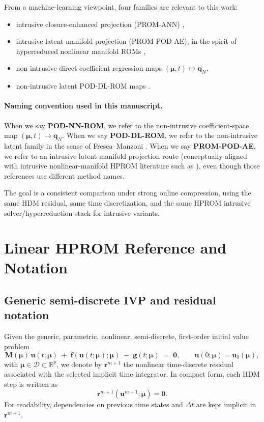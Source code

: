 \documentclass[11pt]{article}
\begin{document}
From a machine-learning viewpoint, four families are relevant to this work:
\begin{itemize}
\item intrusive closure-enhanced projection (PROM-ANN) \cite{barnett2023neural},
\item intrusive latent-manifold projection (PROM-POD-AE), in the spirit of hyperreduced nonlinear manifold ROMs \cite{romor2025explicable},
\item non-intrusive direct-coefficient regression maps $(\bm\mu,t)\mapsto\mathbf q_N$,
\item non-intrusive latent POD-DL-ROM maps \cite{fresca2022pod}.
\end{itemize}

\paragraph{Naming convention used in this manuscript.}
When we say \textbf{POD-NN-ROM}, we refer to the non-intrusive coefficient-space
map $(\bm\mu,t)\mapsto\mathbf q_N$. When we say \textbf{POD-DL-ROM}, we refer to
the non-intrusive latent family in the sense of Fresca--Manzoni
\cite{fresca2022pod}. When we say \textbf{PROM-POD-AE}, we refer
to an intrusive latent-manifold projection route (conceptually aligned with
intrusive nonlinear-manifold HPROM literature such as \cite{romor2025explicable}),
even though those references use different method names.

The goal is a consistent comparison under strong online compression, using the same HDM residual, same time discretization, and the same HPROM intrusive solver/hyperreduction stack for intrusive variants.

\section{Linear HPROM Reference and Notation}
\label{sec:linear-rom}

\subsection{Generic semi-discrete IVP and residual notation}
Given the generic, parametric, nonlinear, semi-discrete, first-order initial
value problem
\begin{equation}
\mathbf M(\bm\mu)\,\dot{\mathbf u}(t;\bm\mu)
\;+\;
\mathbf f\!\left(\mathbf u(t;\bm\mu);\bm\mu\right)
\;-\;
\mathbf g(t;\bm\mu)
\;=\;\mathbf 0,
\qquad
\mathbf u(0;\bm\mu)=\mathbf u_0(\bm\mu),
\label{eq:generic-ivp}
\end{equation}
with $\bm\mu\in\mathcal D\subset\mathbb R^p$, we denote by
$\mathbf r^{m+1}$ the nonlinear time-discrete residual associated with the
selected implicit time integrator. In compact form, each HDM step is written
as
\begin{equation}
\mathbf r^{m+1}\!\left(\mathbf u^{m+1};\bm\mu\right)=\mathbf 0.
\label{eq:generic-discrete-residual}
\end{equation}
For readability, dependencies on previous time states and $\Delta t$ are kept
implicit in $\mathbf r^{m+1}$.
\end{document}
